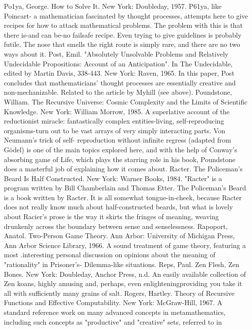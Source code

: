 Po1ya, George. How to Solve It. New York: Doubleday, 1957. P61ya, like Poincart- a
 mathematician fascinated by thought processes, attempts here to give recipes for how to
 attack mathematical problems. The problem with this is that there is-and can be-no failsafe
 recipe. Even trying to give guidelines is probably futile. The nose that smells the right route
 is simply rare, and there are no two ways about it.
Post, Emil. "Absolutely Unsolvable Problems and Relatively Undecidable Propositions:
 Account of an Anticipation". In The Undecidable, edited by Martin Davis, 338-443. New
 York: Raven, 1965. In this paper, Post concludes that mathematicians' thought processes are
 essentially creative and non-mechanizable. Related to the article by Myhill (see above).
Poundstone, William. The Recursive Universe: Cosmic Complexity and the Limits of
 Scientific Knowledge. New York: William Morrow, 1985. A superlative account of the
 reductionist miracle: fantastically complex entities-living, self-reproducing organisms-turn
 out to be vast arrays of very simply interacting parts. Von Neumann's trick of self-
 reproduction without infinite regress (adapted from Gödel) is one of the main topics
 explored here, and with the help of Conway's absorbing game of Life, which plays the
 starring role in his book, Poundstone does a masterful job of explaining how it comes about.
Racter. The Policeman's Beard Is Half Constructed. New York: Warner Books, 1984.
 "Racter" is a program written by Bill Chamberlain and Thomas Etter. The Policeman's
 Beard is a book written by Racter. It is all somewhat tongue-in-cheek, because Racter does
 not really know much about half-constructed beards, but what is lovely about Racier's prose
 is the way it skirts the fringes of meaning, weaving drunkenly across the boundary between
 sense and senselessness.
Rapoport, Anatol. Two-Person Game Theory. Ann Arbor: University of Michigan Press, Ann
 Arbor Science Library, 1966. A sound treatment of game theory, featuring a most
 .interesting personal discussion on opinions about the meaning of "rationality" in Prisoner's-
 Dilemma-like situations.
Reps, Paul. Zen Flesh, Zen Bones. New York: Doubleday, Anchor Press, n.d. An easily
 available collection of Zen koans, highly amusing and, perhaps, even enlighteningproviding
 you take it all with sufficiently many grains of salt.
Rogers, Hartley. Theory of Recursive Functions and Effective Computability. New York:
 McGraw-Hill, 1967. A standard reference work on many advanced concepts in
 metamathematics, including such concepts as "productive" and "creative" sets, referred to in
